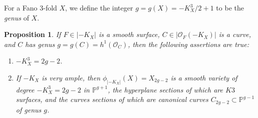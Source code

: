 \documentclass[11pt]{amsart}
\theoremstyle{plain}
\newtheorem{proposition}[theorem]{Proposition}
\theoremstyle{definition}
\theoremstyle{expl}
\begin{document}
For a Fano $3$-fold $X$, we define the integer $g=g(X)= -K_X^3/2+1 $ to be the \textit{genus} of $X$.
\begin{proposition}
\label{A}
    If $F \in |-K_X|$ is a smooth surface, $C \in |\mathcal{O}_F(-K_X)|$ is a curve, and $C$ has genus $g=g(C) = h^1(\mathcal{O}_C)$, then the following assertions are true:
    \begin{enumerate}
        \item[(i)] $-K_{X}^3 = 2g-2 $.
        \item[(ii)] If $-K_X$ is very ample, then $\phi_{|-K_X|}(X)= X_{2g-2}$ is a smooth variety of degree $-K_{X}^3 = 2g-2$ in $\mathbb{P}^{g+1}$, the hyperplane sections of which are $K3$ surfaces, and the curves sections of which are canonical curves $C_{2g-2} \subset \mathbb{P}^{g-1}$ of genus $g$.
    \end{enumerate}
\end{proposition}
\end{document}
